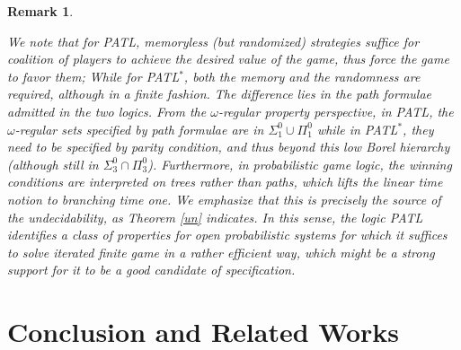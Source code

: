 \documentclass[times, 10 pt,twocolumn]{article}
\newtheorem{remark}{Remark}{\itshape}{\rm}
\begin{document}
\begin{remark} \label{mark3}


We note that for PATL, \emph{memoryless} (but randomized)
strategies suffice for coalition of players to achieve the desired
value of the game, thus force the game to favor them; While for
PATL$^*$, both the \emph{memory} and the \emph{randomness} are
required, although in a \emph{finite} fashion. The difference lies
in the \emph{path} formulae admitted in the two logics. From the
$\omega$-regular property perspective, in PATL, the
$\omega$-regular sets specified by path formulae are in
$\Sigma_1^0 \cup\Pi_1^0$ while in PATL$^*$, they need to be
specified by parity condition, and thus beyond this low Borel
hierarchy (although still in $\Sigma_3^0 \cap\Pi_3^0$).
Furthermore, in probabilistic game logic, the winning conditions
are interpreted on \emph{trees} rather than \emph{paths}, which
lifts the \emph{linear} time notion to \emph{branching} time one.
We emphasize that this is precisely the source of the
undecidability, as Theorem \ref{un} indicates. In
this sense, the logic PATL %
identifies a class of properties for open probabilistic systems
for which it suffices to solve iterated finite game in a rather
efficient way, which might be a strong support for it to be a good
candidate
of specification. %
\end{remark}



\section{Conclusion and Related Works} \label{sec5}

\end{document}
